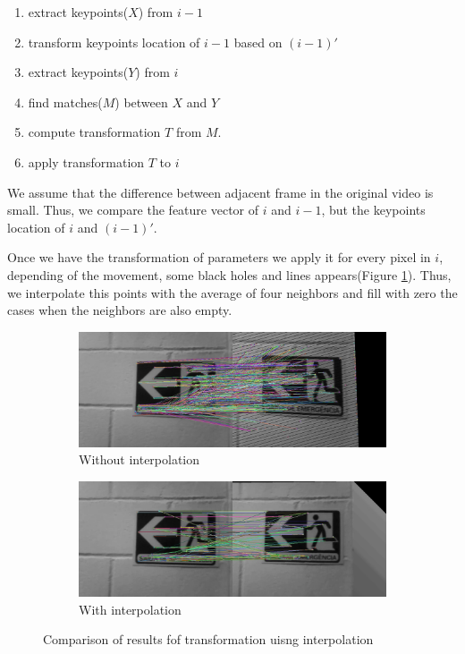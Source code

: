 \begin{enumerate}
	\item extract keypoints($X$) from $i-1$
	\item transform keypoints location of $i-1$ based on $(i-1)'$
	\item extract keypoints($Y$) from $i$
	\item find matches($M$) between $X$ and $Y$
	\item compute transformation $T$ from $M$.
	\item apply transformation $T$ to $i$
\end{enumerate}

We assume that the difference between adjacent frame in the original video is small. Thus, we compare the feature vector of $i$ and $i-1$, but the keypoints location of $i$ and $(i-1)'$.

Once we have the transformation of parameters we apply it for every pixel in $i$, depending of the movement, some black holes and lines appears(Figure \ref{fig:diff-interpolation}). Thus, we interpolate this points with the average of four neighbors and fill with zero the cases when the neighbors are also empty.

\begin{figure}[!h]
	\centering
	\begin{subfigure}{0.5\textwidth}
	  \centering
	  \includegraphics[width=0.8\linewidth]{figs/without-interpolation.jpg}
	  \caption{Without interpolation}
	\end{subfigure}%
	\begin{subfigure}{0.5\textwidth}
	  \centering
	  \includegraphics[width=0.8\linewidth]{figs/with-interpolation.jpg}
	  \caption{With interpolation}
	\end{subfigure}%
	 \caption{Comparison of results fof transformation uisng interpolation}
	\label{fig:diff-interpolation}
\end{figure}



